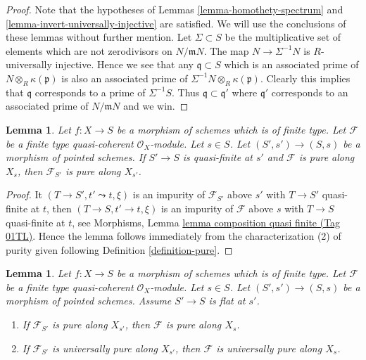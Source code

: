 \documentclass{amsart}
\theoremstyle{plain}
\newtheorem{lemma}[subsection]{Lemma}
\theoremstyle{definition}
\theoremstyle{remark}
\numberwithin{equation}{subsection}
\begin{document}
\begin{proof}
Note that the hypotheses of
Lemmas \ref{lemma-homothety-spectrum} and
\ref{lemma-invert-universally-injective}
are satisfied. We will use the conclusions of these lemmas without further
mention. Let $\Sigma \subset S$ be the multiplicative set of elements
which are not zerodivisors on $N/\mathfrak mN$. The map
$N \to \Sigma^{-1}N$ is $R$-universally injective. Hence we see that
any $\mathfrak q \subset S$ which is an associated prime of
$N \otimes_R \kappa(\mathfrak p)$ is also an associated prime of
$\Sigma^{-1}N \otimes_R \kappa(\mathfrak p)$. Clearly this implies that
$\mathfrak q$ corresponds to a prime of $\Sigma^{-1}S$.
Thus $\mathfrak q \subset \mathfrak q'$ where $\mathfrak q'$
corresponds to an associated prime of $N/\mathfrak mN$ and we win.
\end{proof}


\begin{lemma}
\label{lemma-quasi-finite-base-change}
Let $f : X \to S$ be a morphism of schemes which is of finite type.
Let $\mathcal{F}$ be a finite type quasi-coherent $\mathcal{O}_X$-module.
Let $s \in S$. Let $(S', s') \to (S, s)$ be a morphism of pointed schemes.
If $S' \to S$ is quasi-finite at $s'$ and $\mathcal{F}$ is pure along $X_s$,
then $\mathcal{F}_{S'}$ is pure along $X_{s'}$.
\end{lemma}

\begin{proof}
It $(T \to S', t' \leadsto t, \xi)$ is an impurity of
$\mathcal{F}_{S'}$ above $s'$ with $T \to S'$ quasi-finite at $t$,
then $(T \to S, t' \to t, \xi)$ is an impurity of $\mathcal{F}$
above $s$ with $T \to S$ quasi-finite at $t$, see
Morphisms, Lemma \href{https://stacks.math.columbia.edu/tag/01TL}{lemma composition quasi finite (Tag 01TL)}.
Hence the lemma follows immediately from the characterization (2)
of purity given following
Definition \ref{definition-pure}.
\end{proof}


\begin{lemma}
\label{lemma-flat-descend-pure}
Let $f : X \to S$ be a morphism of schemes which is of finite type.
Let $\mathcal{F}$ be a finite type quasi-coherent $\mathcal{O}_X$-module.
Let $s \in S$. Let $(S', s') \to (S, s)$ be a morphism of pointed schemes.
Assume $S' \to S$ is flat at $s'$.
\begin{enumerate}
\item If $\mathcal{F}_{S'}$ is pure along $X_{s'}$,
then $\mathcal{F}$ is pure along $X_s$.
\item If $\mathcal{F}_{S'}$ is universally pure along $X_{s'}$,
then $\mathcal{F}$ is universally pure along $X_s$.
\end{enumerate}
\end{lemma}
\end{document}
